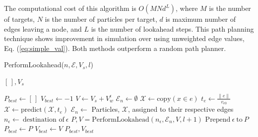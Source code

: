 \documentclass[letterpaper, 10 pt, conference]{ieeeconf}  %
\begin{document}

The computational cost of this algorithm is $O(MNd^L)$, where $M$ is the number of targets, $N$ is the number of particles per target, $d$ is maximum number of edges leaving a node, and $L$ is the number of lookahead steps. This path planning technique shows improvement in simulation over using unweighted edge values, Eq. (\ref{eq:simple_val}). Both methods outperform a random path planner.

\begin{algorithm}
\caption{PerformLookahead($n, \mathcal{E}, V_s, l$)}
\begin{algorithmic}[1]
\RETURN $[\,], V_s$
\ENDIF

\STATE $P_{best} \gets[\,]$
\STATE $V_{best} \gets -1$
\STATE $V \gets V_s + V_w^\epsilon$ 
\STATE $\mathcal{E}_n \gets \emptyset$
\STATE $\mathcal{X} \gets \text{copy}(x \in e)$
\STATE $t_e \gets \frac{\lVert e \rVert}{v_{e0}}$
\STATE $\mathcal{X} \gets \text{predict}(\mathcal{X}, t_e)$
\STATE $\mathcal{E}_n \gets$ Particles, $\mathcal{X}$, assigned to their respective edges
\ENDIF
\ENDFOR
\STATE $n_\epsilon \gets \ \text{destination of} \ \epsilon$
\STATE $P, V = \text{PerformLookahead}(n_\epsilon, \mathcal{E}_n, V, l+1)$
\STATE $\text{Prepend} \ \epsilon \ \text{to} \ P$
\STATE $P_{best} \gets P$
\STATE $V_{best} \gets V$
\ENDIF
\ENDFOR
\RETURN $P_{best}, V_{best}$
\end{algorithmic}
\label{lookaheadStep}
\end{algorithm}
\end{document}
